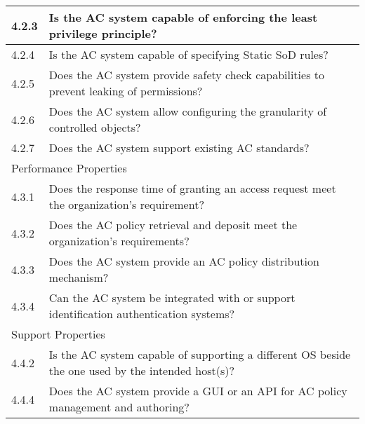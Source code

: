 {\begin{table}[htb]
\begin{tabular}{l|l}
            4.2.3 & \llap{\textbullet} Is the AC system capable of enforcing the least privilege principle? \\ \hline
            4.2.4 & \llap{\textbullet} Is the AC system capable of specifying Static SoD rules? \\ \hline
            4.2.5 & \llap{\textbullet} Does the AC system provide safety check capabilities to prevent leaking of permissions? \\ \hline
            4.2.6 & \llap{\textbullet} Does the AC system allow configuring the granularity of controlled objects? \\ \hline
            4.2.7 & \llap{\textbullet} Does the AC system support existing AC standards? \\ 
            \hline \multicolumn{2}{l}{Performance Properties} \\ \hline
            4.3.1 & \llap{\textbullet} Does the response time of granting an access request meet the organization’s requirement? \\ \hline
            4.3.2 & \llap{\textbullet} Does the AC policy retrieval and deposit meet the organization’s requirements? \\ \hline
            4.3.3 & \llap{\textbullet} Does the AC system provide an AC policy distribution mechanism? \\ \hline
            4.3.4 & \llap{\textbullet} Can the AC system be integrated with or support identification authentication systems? \\
            \hline \multicolumn{2}{l}{Support Properties} \\ \hline
            4.4.2 & \llap{\textbullet} Is the AC system capable of supporting a different OS beside the one used by the intended host(s)? \\ \hline
            4.4.4 & \llap{\textbullet} Does the AC system provide a GUI or an API for AC policy management and authoring? \\
            \hline
        \end{tabular}
    \end{table}
}

